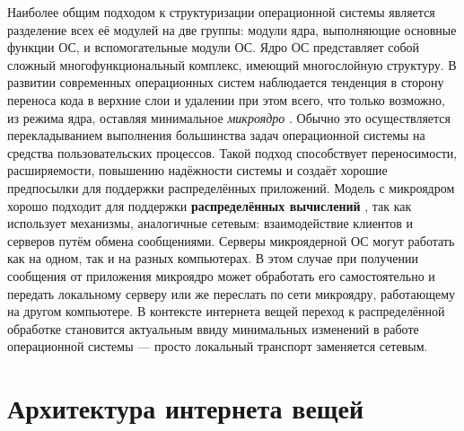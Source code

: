 Наиболее общим подходом к структуризации операционной системы является разделение всех её модулей на две группы: модули ядра, выполняющие основные функции ОС, и вспомогательные модули ОС. Ядро ОС \cite{Olifer} представляет собой сложный многофункциональный комплекс, имеющий многослойную структуру. В развитии современных операционных систем наблюдается тенденция в сторону переноса кода в верхние слои и удалении при этом всего, что только возможно, из режима ядра, оставляя минимальное \textit{микроядро} \cite{Tanenbaum}. Обычно это осуществляется перекладыванием выполнения большинства задач операционной системы на средства пользовательских процессов. Такой подход способствует переносимости, расширяемости, повышению надёжности системы и создаёт хорошие предпосылки для поддержки распределённых приложений. Модель с микроядром хорошо подходит для поддержки \textbf{распределённых вычислений} \cite{Olifer}, так как использует механизмы, аналогичные сетевым: взаимодействие клиентов и серверов путём обмена сообщениями. Серверы микроядерной ОС могут работать как на одном, так и на разных компьютерах. В этом случае при получении сообщения от приложения микроядро может обработать его самостоятельно и передать локальному серверу или же переслать по сети микроядру, работающему на другом компьютере. В контексте интернета вещей переход к распределённой обработке становится актуальным ввиду минимальных изменений в работе операционной системы --- просто локальный транспорт заменяется сетевым.




\section{Архитектура интернета вещей} 

